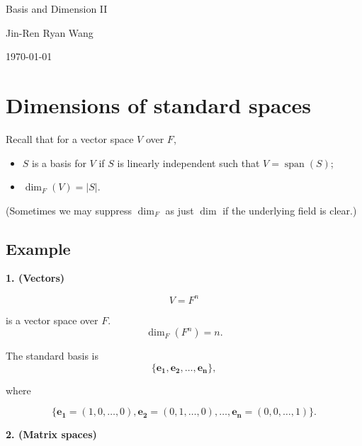 \documentclass[12pt]{article}
\begin{document}
\begin{titlepage}
    \centering

    \vspace*{\fill}

    {\Huge Basis and Dimension II}

    \vspace{1cm}

    {\Large Jin-Ren Ryan Wang\par}

    \vspace{0.5cm}

    {\large \today\par}

    \vspace*{\fill}
\end{titlepage}

\tableofcontents

\newpage

\section{Dimensions of standard spaces}

Recall that for a vector space $V$ over $F$,

\begin{itemize}
    \item $S$ is a basis for $V$ if $S$ is linearly independent such that
    $V=\operatorname{span}(S)$;

    \item $\dim_F(V)=|S|$.
\end{itemize}

(Sometimes we may suppress $\dim_F$ as just $\dim$ if the underlying field is clear.)

\subsection{Example}

\textbf{1. (Vectors)}

\[
V=F^n
\]

is a vector space over $F$.
\[
\dim_F(F^n)=n.
\]

The standard basis is
\[
\{\mathbf{e_1,e_2,\ldots,e_n}\},
\]

where

\[
\{\mathbf{e_1}=(1,0,\ldots,0),
\mathbf{e_2}=(0,1,\ldots,0),
\ldots,
\mathbf{e_n}=(0,0,\ldots,1)\}.
\]

\textbf{2. (Matrix spaces)}
\end{document}
